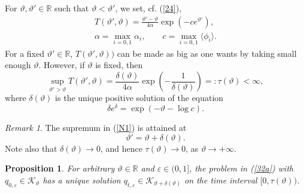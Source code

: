\documentclass[reqno,11pt]{amsart}
\newtheorem{proposition}[theorem]{Proposition}
\theoremstyle{definition}
\theoremstyle{remark}
\newtheorem{remark}[theorem]{Remark}
\numberwithin{equation}{section}
\begin{document}
For $\vartheta, \vartheta'\in \mathds{R}$ such that $\vartheta <
\vartheta'$, we set, cf. (\ref{24}),
\begin{gather}
  \label{21a}
T (\vartheta',\vartheta) = \frac{\vartheta' -
\vartheta}{4\alpha}\exp\left( - c
e^{\vartheta'}\right), \\[.2cm]
\alpha = \max_{i=0,1} \alpha_i, \qquad c = \max_{i=0,1} \langle
\phi_i \rangle.
 \nonumber
\end{gather}
For a fixed $\vartheta'\in \mathds{R}$, $T (\vartheta', \vartheta))$
can be made as big as one wants by taking small enough $\vartheta$.
However, if $\vartheta$ is fixed, then
\begin{equation}
  \label{N1}
 \sup_{\vartheta' > \vartheta} T(\vartheta', \vartheta) = \frac{\delta (\vartheta)}{4 \alpha} \exp\left( -
\frac{1}{\delta (\vartheta)}\right) =: \tau(\vartheta) < \infty,
\end{equation}
where $\delta(\vartheta)$ is the unique positive solution of the
equation
\begin{equation}
  \label{N2}
\delta e^\delta = \exp\left(- \vartheta - \log c \right).
\end{equation}
\begin{remark}
  \label{JJrk}
The supremum in (\ref{N1}) is attained at
\begin{equation*}
 
 \vartheta' = \vartheta + \delta (\vartheta).
\end{equation*}
Note also that $\delta (\vartheta) \to 0$, and hence
$\tau(\vartheta) \to 0$, as $\vartheta \to +\infty$.
\end{remark}
\begin{proposition}
  \label{3tm}
For arbitrary  $ \vartheta \in \mathds{R}$ and $\varepsilon \in
(0,1]$, the problem in (\ref{32a}) with $q_{0,\varepsilon}\in
\mathcal{K}_{\vartheta}$ has a unique solution $q_{t,\varepsilon}\in
\mathcal{K}_{\vartheta+ \delta(\vartheta)}$ on the time interval
$[0, \tau(\vartheta))$.
\end{proposition}
\end{document}

